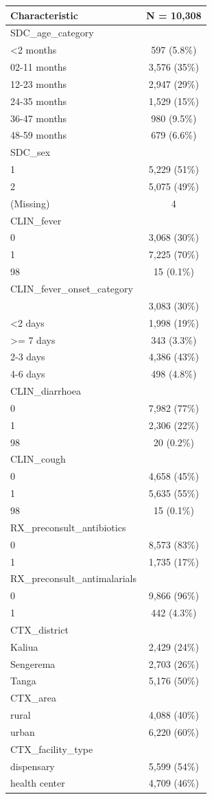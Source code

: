 \documentclass[
  letterpaper,
  DIV=11,
  numbers=noendperiod,
  oneside]{scrreprt}
\begin{document}
\begin{longtable}[]{@{}lc@{}}
\toprule\noalign{}
\textbf{Characteristic} & \textbf{N = 10,308} \\
\midrule\noalign{}
\endhead
\bottomrule\noalign{}
\endlastfoot
SDC\_age\_category & \\
\textless2 months & 597 (5.8\%) \\
02-11 months & 3,576 (35\%) \\
12-23 months & 2,947 (29\%) \\
24-35 months & 1,529 (15\%) \\
36-47 months & 980 (9.5\%) \\
48-59 months & 679 (6.6\%) \\
SDC\_sex & \\
1 & 5,229 (51\%) \\
2 & 5,075 (49\%) \\
(Missing) & 4 \\
CLIN\_fever & \\
0 & 3,068 (30\%) \\
1 & 7,225 (70\%) \\
98 & 15 (0.1\%) \\
CLIN\_fever\_onset\_category & \\
& 3,083 (30\%) \\
\textless2 days & 1,998 (19\%) \\
\textgreater= 7 days & 343 (3.3\%) \\
2-3 days & 4,386 (43\%) \\
4-6 days & 498 (4.8\%) \\
CLIN\_diarrhoea & \\
0 & 7,982 (77\%) \\
1 & 2,306 (22\%) \\
98 & 20 (0.2\%) \\
CLIN\_cough & \\
0 & 4,658 (45\%) \\
1 & 5,635 (55\%) \\
98 & 15 (0.1\%) \\
RX\_preconsult\_antibiotics & \\
0 & 8,573 (83\%) \\
1 & 1,735 (17\%) \\
RX\_preconsult\_antimalarials & \\
0 & 9,866 (96\%) \\
1 & 442 (4.3\%) \\
CTX\_district & \\
Kaliua & 2,429 (24\%) \\
Sengerema & 2,703 (26\%) \\
Tanga & 5,176 (50\%) \\
CTX\_area & \\
rural & 4,088 (40\%) \\
urban & 6,220 (60\%) \\
CTX\_facility\_type & \\
dispensary & 5,599 (54\%) \\
health center & 4,709 (46\%) \\
\end{longtable}
\end{document}
